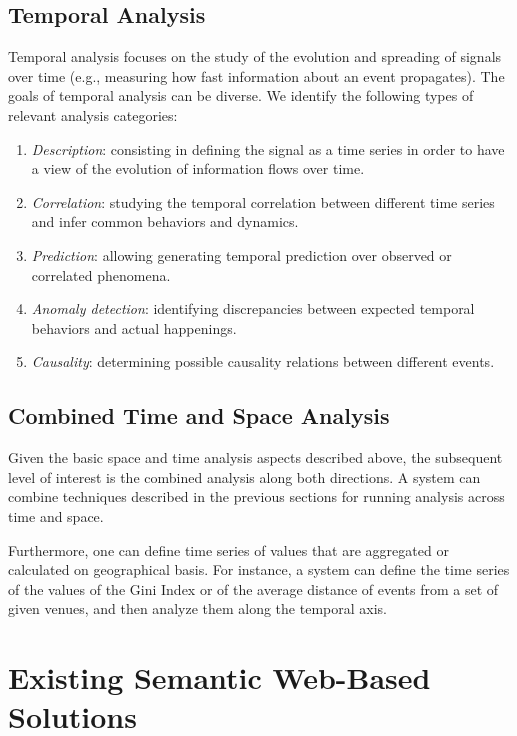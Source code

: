 \subsection{Temporal Analysis}
Temporal analysis focuses on the study of the evolution and spreading of signals over time (e.g., measuring how fast information about an event propagates). 
The goals of temporal analysis can be diverse. We identify the following types of relevant analysis categories:
\begin{enumerate}
\item \textit{Description}: consisting in defining the signal as a time series in order to have a view of the evolution of information flows over time.
\item \textit{Correlation}: studying the temporal correlation between different time series and infer common behaviors and dynamics.
\item \textit{Prediction}: allowing generating temporal prediction over observed or correlated phenomena.
\item \textit{Anomaly detection}: identifying discrepancies between expected temporal behaviors and actual happenings.
\item \textit{Causality}: determining possible causality relations between different events.
\end{enumerate}

\subsection{Combined Time and Space Analysis}
Given the basic space and time analysis aspects described above, the subsequent level of interest is the combined analysis along both directions. A system can combine techniques described in the previous sections for running analysis across time and space. 

Furthermore, one can define time series of values that are aggregated or calculated on geographical basis. For instance, a system can define the time series of the values of the Gini Index or of the average distance of events from a set of given venues, and then analyze them along the temporal axis. 

\section{Existing Semantic Web-Based Solutions}\label{sec:uda-solution}

